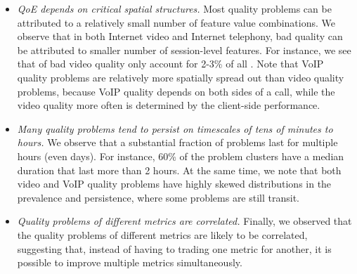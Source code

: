 \begin{itemize}

\item {\em QoE depends on critical spatial structures.}
Most quality problems can be attributed to a relatively small number of feature value
combinations. We observe that in both Internet video and Internet telephony, bad 
quality can be attributed to smaller number of session-level features. For instance,
we see that \criticalclusters of bad video quality only account for 2-3\% of all 
\problemclusters. Note that VoIP quality problems are relatively more spatially spread 
out than video quality problems, because VoIP quality depends on both sides of a call, 
while the video quality more often is determined by the client-side performance.


\item {\em Many quality problems tend to 
persist on timescales of tens of minutes to hours.}
We observe that a substantial fraction of problems
last for multiple hours (even days).
For instance, 60\% of the problem clusters have a median
duration that last more than 2 hours.
At the same time, we note that both video and VoIP quality problems 
have highly skewed distributions in the prevalence 
and persistence, where some problems are still transit.


%

\item {\em Quality problems of different metrics are correlated.} 
Finally, we observed that the quality problems of different metrics are likely 
to be correlated, suggesting that, instead of having to trading one metric for 
another, it is possible to improve multiple metrics simultaneously.

\end{itemize}





